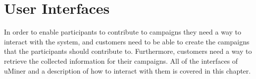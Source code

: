 
\chapter{User Interfaces}
\label{cha:user_interfaces}

In order to enable participants to contribute to campaigns they need a way to interact with the system, and customers need to be able to create the campaigns that the participants should contribute to. Furthermore, customers need a way to retrieve the collected information for their campaigns. All of the interfaces of uMiner and a description of how to interact with them is covered in this chapter.



